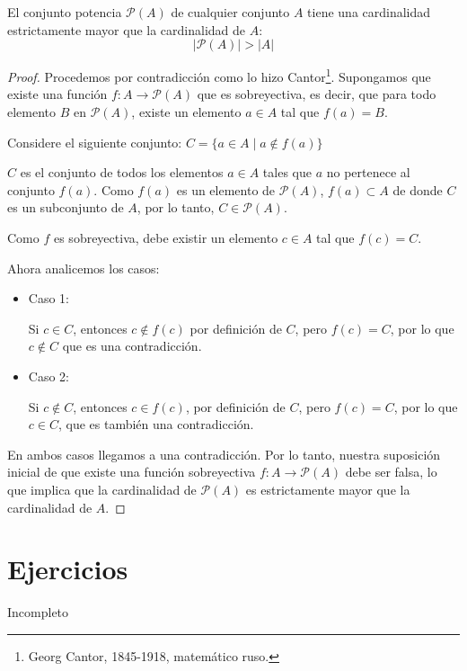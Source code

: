 \begin{fmd-theorem}  
	El conjunto potencia $\mathcal{P}(A)$ de cualquier conjunto $A$ tiene una cardinalidad estrictamente mayor que la cardinalidad de $A$:
	\[ |\mathcal{P}(A)| >  |A| \]
	
	\begin{proof}
		Procedemos por contradicción como lo hizo Cantor\footnote{Georg Cantor, 1845-1918, matemático ruso.}. Supongamos que existe una función $f: A \rightarrow \mathcal{P}(A)$ que es sobreyectiva, es decir, que para todo elemento $B$ en $\mathcal{P}(A)$, existe un elemento $a \in A$ tal que $f(a) = B$.
		
		Considere el siguiente conjunto: $ C = \{ a \in A \mid a \not \in f(a) \} $
		
		$C$ es el conjunto de todos los elementos $a \in A$ tales que $a$ no pertenece al conjunto $f(a)$.
		Como $f(a)$ es un elemento de $\mathcal{P}(A)$, $f(a) \subset A$ de donde $C$ es un subconjunto de $A$, por lo tanto, $C \in \mathcal{P}(A)$.
		
		Como $f$ es sobreyectiva, debe existir un elemento $c \in A$ tal que $f(c) = C$.
		
		Ahora analicemos los casos:
		
		\begin{itemize}
			\item Caso 1:
			
			 Si $c \in C$, entonces $c \not \in f(c)$ por definición de $C$, pero $f(c) = C$, por lo que $c \not \in C$ que es una contradicción.
			\item Caso 2:
			
			Si $c \not \in C$, entonces $c \in f(c)$, por definición de $C$, pero $f(c) = C$, por lo que $c \in C$, que es también una contradicción.
		\end{itemize}
		En ambos casos llegamos a una contradicción. Por lo tanto, nuestra suposición inicial de que existe una función sobreyectiva $f: A \rightarrow \mathcal{P}(A)$ debe ser falsa, lo que implica que la cardinalidad de $\mathcal{P}(A)$ es estrictamente mayor que la cardinalidad de $A$.
	\end{proof}
\end{fmd-theorem}


\section{Ejercicios}

{ \color{red} Incompleto }

